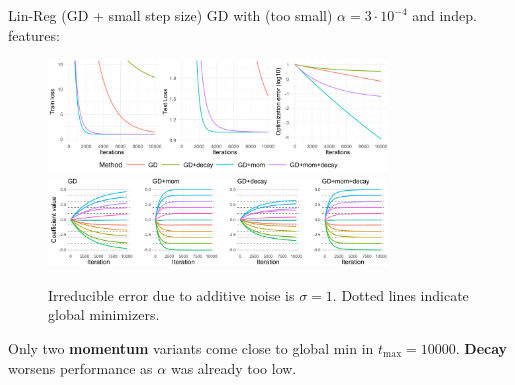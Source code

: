 \documentclass[11pt,compress,t,notes=noshow, xcolor=table]{beamer}
\begin{document}
\begin{vbframe}{Lin-Reg (GD + small step size)}
\vspace{-0.4cm}
GD with (too small) $\alpha=3\cdot10^{-4}$ and indep. features:
\begin{figure}
            \includegraphics[width=0.8\textwidth]{figure_man/simu_linmod/GD_reg_small_lr_iters.pdf} \\
             \includegraphics[width=0.8\textwidth]{figure_man/simu_linmod/GD_reg_coef_small.pdf}\\
            \begin{footnotesize}
                Irreducible error due to additive noise is $\sigma=1$. Dotted lines indicate global minimizers.
            \end{footnotesize}
\end{figure}
Only two \textbf{momentum} variants come close to global min in $t_{\text{max}}=10000$. \textbf{Decay} worsens performance as $\alpha$ was already too low.
\end{vbframe}
\end{document}
